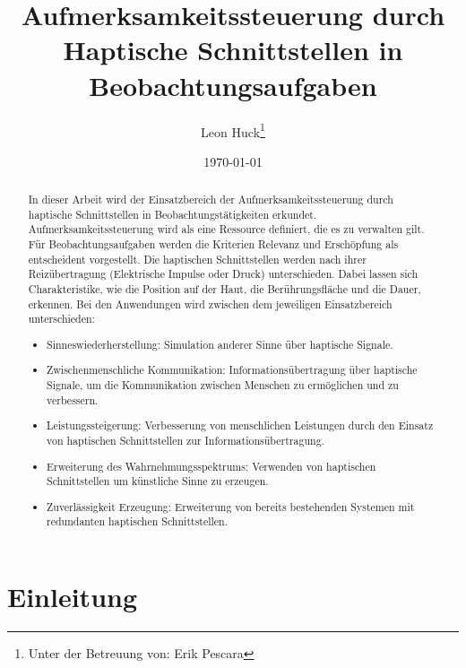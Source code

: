 \documentclass{llncs}					%
\title{Aufmerksamkeitssteuerung durch Haptische Schnittstellen in Beobachtungsaufgaben}
\author{Leon Huck\thanks{Unter der Betreuung von: Erik Pescara}}
\institute{Karlsruher Institut für Technologie}
\date{\today}
\begin{document}
	
\maketitle

\begin{description}
	\item 
\end{description}

\begin{abstract}
	In dieser Arbeit wird der Einsatzbereich der Aufmerksamkeitssteuerung durch haptische Schnittstellen in Beobachtungstätigkeiten erkundet. Aufmerksamkeitssteuerung wird als eine Ressource definiert, die es zu verwalten gilt. Für Beobachtungsaufgaben werden die Kriterien Relevanz und Erschöpfung als entscheident vorgestellt. Die haptischen Schnittstellen werden nach ihrer Reizübertragung (Elektrische Impulse oder Druck) unterschieden. Dabei lassen sich Charakteristike, wie die Position auf der Haut, die Berührungsfläche und die Dauer, erkennen.
    Bei den Anwendungen wird zwischen dem jeweiligen Einsatzbereich unterschieden:
    \begin{itemize}
        \item Sinneswiederherstellung: Simulation anderer Sinne über haptische Signale.
        \item Zwischenmenschliche Kommunikation: Informationsübertragung über haptische Signale, um die Kommunikation zwischen Menschen zu ermöglichen und zu verbessern.
        \item Leistungssteigerung: Verbesserung von menschlichen Leistungen durch den Einsatz von haptischen Schnittstellen zur Informationsübertragung.
        \item Erweiterung des Wahrnehmungsspektrums: Verwenden von haptischen Schnittstellen um künstliche Sinne zu erzeugen.
        \item Zuverlässigkeit Erzeugung: Erweiterung von bereits bestehenden Systemen mit redundanten haptischen Schnittstellen.
    \end{itemize}
    
\end{abstract}


\clearpage
\section{Einleitung}
\end{document}
